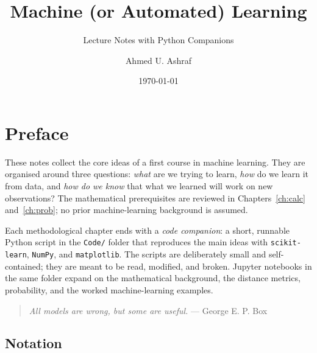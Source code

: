 \documentclass[a4paper, 12pt]{book}
\title{Machine (or Automated) Learning}
\subtitle{Lecture Notes with Python Companions}
\author{Ahmed U. Ashraf}
\date{\today}
\begin{document}
\frontmatter
\maketitle
\makeatletter
\let\hypercontentsline=\contentsline
\renewcommand{\contentsline}[4]{%
  \hypertarget{toc.#4}{}\hypercontentsline{#1}{#2}{#3}{#4}}
\makeatother
\tableofcontents\label{toc}

\chapter*{Preface}

These notes collect the core ideas of a first course in machine learning. They are
organised around three questions: \emph{what} are we trying to learn, \emph{how} do
we learn it from data, and \emph{how do we know} that what we learned will work on
new observations? The mathematical prerequisites are reviewed in
Chapters~\ref{ch:calc} and~\ref{ch:prob}; no prior machine-learning background is
assumed.

Each methodological chapter ends with a \emph{code companion}: a short, runnable
Python script in the \texttt{Code/} folder that reproduces the main ideas with
\texttt{scikit-learn}, \texttt{NumPy}, and \texttt{matplotlib}. The scripts are
deliberately small and self-contained; they are meant to be read, modified, and
broken. Jupyter notebooks in the same folder expand on the mathematical background,
the distance metrics, probability, and the worked machine-learning examples.

\begin{quote}
\emph{All models are wrong, but some are useful.} --- George E. P. Box
\end{quote}

\section*{Notation}
\end{document}
